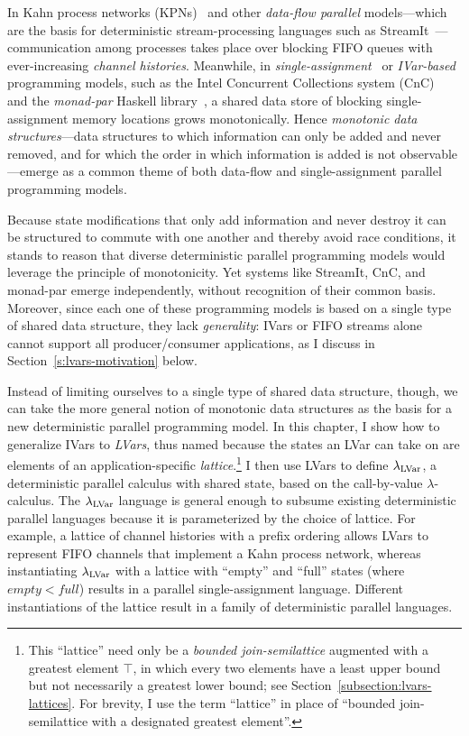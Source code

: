 In Kahn process networks (KPNs)~\cite{Kahn-1974} and other
\emph{data-flow parallel} models---which are the basis for
deterministic stream-processing languages such as
StreamIt~\cite{streamit-asplos}---communication among processes takes
place over blocking FIFO queues with ever-increasing \emph{channel
  histories}.  Meanwhile, in
\emph{single-assignment}~\cite{Tesler-1968} or
\emph{IVar-based}~\cite{IStructures} programming models, such as the
Intel Concurrent Collections system (CnC)~\cite{CnC} and the
\emph{monad-par} Haskell library~\cite{monad-par}, a shared data store
of blocking single-assignment memory locations grows monotonically.
Hence \emph{monotonic data structures}---data structures to which
information can only be added and never removed, and for which the
order in which information is added is not observable---emerge as a
common theme of both data-flow and single-assignment parallel
programming models.

Because state modifications that only add information and never
destroy it can be structured to commute with one another and thereby
avoid race conditions, it stands to reason that diverse deterministic
parallel programming models would leverage the principle of
monotonicity.  Yet systems like StreamIt, CnC, and monad-par emerge
independently, without recognition of their common basis.  Moreover,
since each one of these programming models is based on a single type
of shared data structure, they lack \emph{generality}: IVars or FIFO
streams alone cannot support all producer/consumer applications, as I
discuss in Section~\ref{s:lvars-motivation} below.

Instead of limiting ourselves to a single type of shared data
structure, though, we can take the more general notion of monotonic
data structures as the basis for a new deterministic parallel
programming model.  In this chapter, I show how to generalize IVars
to \emph{LVars}, thus named because the states an LVar can take on are
elements of an application-specific \emph{lattice}.\footnote{This
``lattice'' need only be a \emph{bounded join-semilattice} augmented
with a greatest element $\top$, in which every two elements have a
least upper bound but not necessarily a greatest lower bound; see
Section~\ref{subsection:lvars-lattices}.  For brevity, I use the term
``lattice'' in place of ``bounded join-semilattice with a designated
greatest element''.}  I then use LVars to define $\lambda_{\textrm{LVar}}$, a
deterministic parallel calculus with shared state, based on the
call-by-value $\lambda$-calculus.  The $\lambda_{\textrm{LVar}}$ language is
general enough to subsume existing deterministic parallel languages
because it is parameterized by the choice of lattice.  For example, a
lattice of channel histories with a prefix ordering allows LVars to
represent FIFO channels that implement a Kahn process network, whereas
instantiating $\lambda_{\textrm{LVar}}$ with a lattice with ``empty'' and ``full''
states (where $\mathit{empty} <
\mathit{full}$) results in a parallel single-assignment language.
Different instantiations of the lattice result in a family of
deterministic parallel languages.

